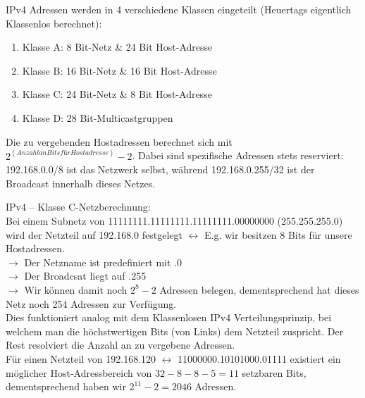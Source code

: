 \documentclass{article}
\begin{document}
\begin{enumerate}
        IPv4 Adressen werden in 4 verschiedene Klassen eingeteilt (Heuertags eigentlich Klassenlos berechnet):
        \begin{enumerate}
            \item Klasse A: 8 Bit-Netz \& 24 Bit Host-Adresse 
            \item Klasse B: 16 Bit-Netz \& 16 Bit Host-Adresse
            \item Klasse C: 24 Bit-Netz \& 8 Bit Host-Adresse
            \item Klasse D: 28 Bit-Multicastgruppen
    \end{enumerate}
        Die zu vergebenden Hostadressen berechnet sich mit $2^(Anzahl an Bits für Hostadresse) - 2$. Dabei sind spezifische Adressen stets reserviert: 192.168.0.0/8 ist das Netzwerk selbst, während 192.168.0.255/32 ist der Broadcast innerhalb dieses Netzes.
        
        IPv4 -- Klasse C-Netzberechnung:\\
        Bei einem Subnetz von 11111111.11111111.11111111.00000000 (255.255.255.0) wird der Netzteil auf 192.168.0 festgelegt $\leftrightarrow$ E.g. wir besitzen 8 Bits für unsere Hostadressen.\\
        $\rightarrow$ Der Netzname ist predefiniert mit .0\\
        $\rightarrow$ Der Broadcsat liegt auf .255\\
        $\rightarrow$ Wir können damit noch $2^8 - 2$ Adressen belegen, dementsprechend hat dieses Netz noch 254 Adressen zur Verfügung.\\
        
        Dies funktioniert analog mit dem Klassenlosen IPv4 Verteilungsprinzip, bei welchem man die höchstwertigen Bits (von Links) dem Netzteil zuspricht. Der Rest resolviert die Anzahl an zu vergebene Adressen.\\
        Für einen Netzteil von 192.168.120 $\leftrightarrow$ 11000000.10101000.01111 existiert ein möglicher Host-Adressbereich von $32-8-8-5 = 11$ setzbaren Bits, dementsprechend haben wir $2^11 - 2 = 2046$  Adressen. \\
        

\end{enumerate}
\end{document}

